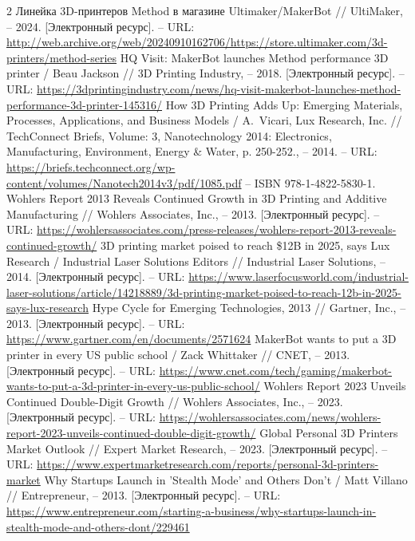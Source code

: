 \documentclass{article}
\begin{document}
\begin{thebibliography}{2}
 Линейка 3D-принтеров Method в магазине Ultimaker/MakerBot // UltiMaker, – 2024. [Электронный ресурс]. – URL: \url{http://web.archive.org/web/20240910162706/https://store.ultimaker.com/3d-printers/method-series}
 HQ Visit: MakerBot launches Method performance 3D printer / Beau Jackson // 3D Printing Industry, – 2018. [Электронный ресурс]. – URL: \url{https://3dprintingindustry.com/news/hq-visit-makerbot-launches-method-performance-3d-printer-145316/}
 How 3D Printing Adds Up: Emerging Materials, Processes, Applications, and Business Models / A.~Vicari, Lux Research, Inc. // TechConnect Briefs, Volume: 3, Nanotechnology 2014: Electronics, Manufacturing, Environment, Energy \& Water, p. 250-252., – 2014. – URL: \url{https://briefs.techconnect.org/wp-content/volumes/Nanotech2014v3/pdf/1085.pdf} – ISBN 978-1-4822-5830-1.
 Wohlers Report 2013 Reveals Continued Growth in 3D Printing and Additive Manufacturing // Wohlers Associates, Inc., – 2013. [Электронный ресурс]. – URL: \url{https://wohlersassociates.com/press-releases/wohlers-report-2013-reveals-continued-growth/}
 3D printing market poised to reach \$12B in 2025, says Lux Research / Industrial Laser Solutions Editors // Industrial Laser Solutions, – 2014. [Электронный ресурс]. – URL: \url{https://www.laserfocusworld.com/industrial-laser-solutions/article/14218889/3d-printing-market-poised-to-reach-12b-in-2025-says-lux-research}
 Hype Cycle for Emerging Technologies, 2013 // Gartner, Inc., – 2013. [Электронный ресурс]. – URL: \url{https://www.gartner.com/en/documents/2571624}
 MakerBot wants to put a 3D printer in every US public school / Zack Whittaker // CNET, – 2013. [Электронный ресурс]. – URL: \url{https://www.cnet.com/tech/gaming/makerbot-wants-to-put-a-3d-printer-in-every-us-public-school/}
 Wohlers Report 2023 Unveils Continued Double-Digit Growth // Wohlers Associates, Inc., – 2023. [Электронный ресурс]. – URL: \url{https://wohlersassociates.com/news/wohlers-report-2023-unveils-continued-double-digit-growth/}
 Global Personal 3D Printers Market Outlook // Expert Market Research, – 2023. [Электронный ресурс]. – URL: \url{https://www.expertmarketresearch.com/reports/personal-3d-printers-market}
 Why Startups Launch in 'Stealth Mode' and Others Don't / Matt Villano // Entrepreneur, – 2013. [Электронный ресурс]. – URL: \url{https://www.entrepreneur.com/starting-a-business/why-startups-launch-in-stealth-mode-and-others-dont/229461}

\end{thebibliography}
\end{document}

